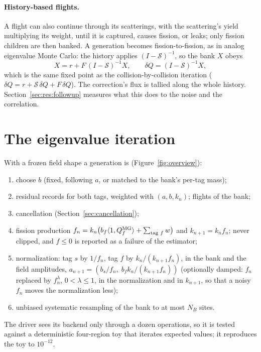 \paragraph{History-based flights.} A flight can also continue through its scatterings, with the
scattering's yield multiplying its weight, until it is captured, causes fission, or leaks; only fission
children are then banked. A generation becomes fission-to-fission, as in analog eigenvalue Monte Carlo:
the history applies $(I-\mathcal S)^{-1}$, so the bank $X$ obeys
\begin{equation}
X = r + F\,(I-\mathcal S)^{-1} X,\qquad \delta Q = (I-\mathcal S)^{-1}X,
\end{equation}
which is the same fixed point as the collision-by-collision iteration
($\delta Q=r+\mathcal S\,\delta Q+F\,\delta Q$). The correction's flux is tallied along the whole
history. Section~\ref{sec:res:followup} measures what this does to the noise and the correlation.

\section{The eigenvalue iteration}\label{sec:iteration}

With a frozen field shape a generation is (Figure~\ref{fig:overview}):
\begin{enumerate}
\item choose $b$ (fixed, following $a$, or matched to the bank's per-tag mass);
\item residual records for both tags, weighted with $(a,b,k_n)$; flights of the bank;
\item cancellation (Section~\ref{sec:cancellation});
\item fission production $f_n=k_n\big(b_f\langle1,Q^{\mathrm{MG}}_f\rangle+\sum_{\text{tag }f}w\big)$ and
  $k_{n+1}=k_nf_n$; never clipped, and $f\le0$ is reported as a failure of the estimator;
\item normalization: tag $s$ by $1/f_n$, tag $f$ by $k_n/(k_{n+1}f_n)$, in the bank and the field
  amplitudes, $a_{n+1}=(b_s/f_n,\;b_fk_n/(k_{n+1}f_n))$ (optionally damped: $f_n$ replaced by
  $f_n^{\lambda}$, $0<\lambda\le1$, in the normalization and in $k_{n+1}$, so that a noisy $f_n$ moves
  the normalization less);
\item unbiased systematic resampling of the bank to at most $N_B$ sites.
\end{enumerate}
The driver sees its backend only through a dozen operations, so it is tested against a deterministic
four-region toy that iterates expected values; it reproduces the toy to $10^{-12}$.

